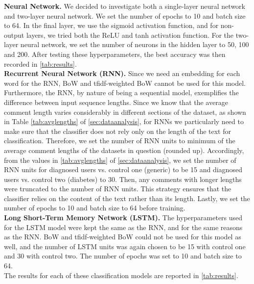 \documentclass[11pt,a4paper]{article}
\begin{document}
\indent \textbf{Neural Network.} We decided to investigate both a single-layer neural network and two-layer neural network. We set the number of epochs to 10 and batch size to 64. In the final layer, we use the sigmoid activation function, and for non-output layers, we tried both the ReLU and tanh activation function. For the two-layer neural network, we set the number of neurons in the hidden layer to 50, 100 and 200. After testing these hyperparameters, the best accuracy was then recorded in \autoref{tab:results}. \\
\indent \textbf{Recurrent Neural Network (RNN).} Since we need an embedding for each word for the RNN, BoW and tfidf-weighted BoW cannot be used for this model. Furthermore, the RNN, by nature of being a sequential model, exemplifies the difference between input sequence lengths. Since we know that the average comment length varies considerably in different sections of the dataset, as shown in Table \ref{tab:avglengths} of \autoref{sec:dataanalysis}, for RNNs we particularly need to make sure that the classifier does not rely only on the length of the text for classification. Therefore, we set the number of RNN units to minimum of the average comment lengths of the datasets in question (rounded up). Accordingly, from the values in \autoref{tab:avglengths} of \autoref{sec:dataanalysis}, we set the number of RNN units for diagnosed users vs. control one (generic) to be 15 and diagnosed users vs. control two (diabetes) to 30. Then, any comments with longer lengths were truncated to the number of RNN units. This strategy ensures that the classifier relies on the content of the text rather than its length. Lastly, we set the number of epochs to 10 and batch size to 64 before training. \\
\indent \textbf{Long Short-Term Memory Network (LSTM).} The hyperparameters used for the LSTM model were kept the same as the RNN, and for the same reasons as the RNN. BoW and tfidf-weighted BoW could not be used for this model as well, and the number of LSTM units was again chosen to be 15 with control one and 30 with control two. The number of epochs was set to 10 and batch size to 64. \\
\indent The results for each of these classification models are reported in \autoref{tab:results}. \\
\end{document}
